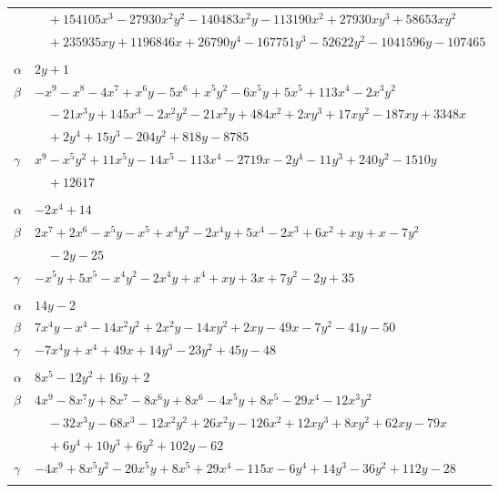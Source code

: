 \documentclass[11pt]{article}
\begin{document}
\begin{longtable}{@{}ll@{}}
 & $\quad +154105x^{3}-27930x^{2}y^{2}-140483x^{2}y-113190x^{2}+27930xy^{3}+58653xy^{2}$\\
 & $\quad +235935xy+1196846x+26790y^{4}-167751y^{3}-52622y^{2}-1041596y-107465$\\
\addlinespace[3pt]
\multicolumn{2}{@{}l}{$\{i,j\}=\{29,32\}$, $k_{ij}=2^{2}\cdot 3^{5}\cdot 5\cdot 7$}\\
$\alpha$ & $2y+1$\\
$\beta$ & $-x^{9}-x^{8}-4x^{7}+x^{6}y-5x^{6}+x^{5}y^{2}-6x^{5}y+5x^{5}+113x^{4}-2x^{3}y^{2}$\\
 & $\quad -21x^{3}y+145x^{3}-2x^{2}y^{2}-21x^{2}y+484x^{2}+2xy^{3}+17xy^{2}-187xy+3348x$\\
 & $\quad +2y^{4}+15y^{3}-204y^{2}+818y-8785$\\
$\gamma$ & $x^{9}-x^{5}y^{2}+11x^{5}y-14x^{5}-113x^{4}-2719x-2y^{4}-11y^{3}+240y^{2}-1510y$\\
 & $\quad +12617$\\
\addlinespace[3pt]
\multicolumn{2}{@{}l}{$\{i,j\}=\{29,35\}$, $k_{ij}=2^{2}$}\\
$\alpha$ & $-2x^{4}+14$\\
$\beta$ & $2x^{7}+2x^{6}-x^{5}y-x^{5}+x^{4}y^{2}-2x^{4}y+5x^{4}-2x^{3}+6x^{2}+xy+x-7y^{2}$\\
 & $\quad -2y-25$\\
$\gamma$ & $-x^{5}y+5x^{5}-x^{4}y^{2}-2x^{4}y+x^{4}+xy+3x+7y^{2}-2y+35$\\
\addlinespace[3pt]
\multicolumn{2}{@{}l}{$\{i,j\}=\{29,38\}$, $k_{ij}=2^{5}\cdot 3$}\\
$\alpha$ & $14y-2$\\
$\beta$ & $7x^{4}y-x^{4}-14x^{2}y^{2}+2x^{2}y-14xy^{2}+2xy-49x-7y^{2}-41y-50$\\
$\gamma$ & $-7x^{4}y+x^{4}+49x+14y^{3}-23y^{2}+45y-48$\\
\addlinespace[3pt]
\multicolumn{2}{@{}l}{$\{i,j\}=\{29,39\}$, $k_{ij}=2^{2}\cdot 3^{2}$}\\
$\alpha$ & $8x^{5}-12y^{2}+16y+2$\\
$\beta$ & $4x^{9}-8x^{7}y+8x^{7}-8x^{6}y+8x^{6}-4x^{5}y+8x^{5}-29x^{4}-12x^{3}y^{2}$\\
 & $\quad -32x^{3}y-68x^{3}-12x^{2}y^{2}+26x^{2}y-126x^{2}+12xy^{3}+8xy^{2}+62xy-79x$\\
 & $\quad +6y^{4}+10y^{3}+6y^{2}+102y-62$\\
$\gamma$ & $-4x^{9}+8x^{5}y^{2}-20x^{5}y+8x^{5}+29x^{4}-115x-6y^{4}+14y^{3}-36y^{2}+112y-28$\\
\addlinespace[3pt]

\end{longtable}
\end{document}
